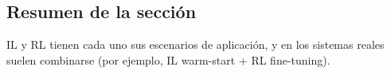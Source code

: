 \subsection{Resumen de la sección}

IL y RL tienen cada uno sus escenarios de aplicación, y en los sistemas reales suelen combinarse (por ejemplo, IL warm-start + RL fine-tuning).

